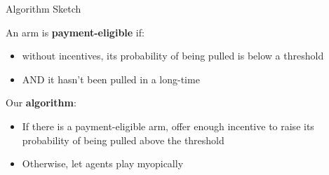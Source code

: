 \documentclass[serif]{beamer}
\begin{document}
\begin{frame}{Algorithm Sketch}

An arm is \textbf{payment-eligible} if:
\begin{itemize}
\item without incentives, its probability of being pulled is below a threshold
\item AND it hasn't been pulled in a long-time
\end{itemize}
\vspace{0.5cm}

Our \textbf{algorithm}:
\begin{itemize}
\item If there is a payment-eligible arm, offer enough incentive to raise its probability of being pulled above the threshold
\item Otherwise, let agents play myopically
\end{itemize}
\end{frame}

%
%




\end{document}
